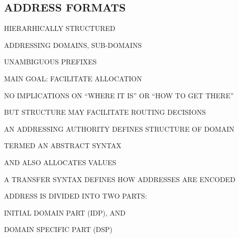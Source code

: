 \begin{bwslide}
\part*	{ADDRESS FORMATS}\bf

\begin{nrtc}
\item	HIERARHICALLY STRUCTURED
    \begin{nrtc}
    \item	ADDRESSING DOMAINS, SUB-DOMAINS

    \item	UNAMBIGUOUS PREFIXES
    \end{nrtc}

\item	MAIN GOAL: FACILITATE ALLOCATION

\item	NO IMPLICATIONS ON ``WHERE IT IS'' OR ``HOW TO GET THERE''
    \begin{nrtc}
    \item	BUT STRUCTURE MAY FACILITATE ROUTING DECISIONS
    \end{nrtc}
\end{nrtc}
\end{bwslide}


\begin{bwslide}

\begin{nrtc}
\item	AN ADDRESSING AUTHORITY DEFINES STRUCTURE OF DOMAIN
    \begin{nrtc}
    \item	TERMED AN ABSTRACT SYNTAX
    \end{nrtc}
    AND ALSO ALLOCATES VALUES

\item	A TRANSFER SYNTAX DEFINES HOW ADDRESSES ARE ENCODED
\end{nrtc}
\end{bwslide}


\begin{bwslide}

\begin{nrtc}
\item	ADDRESS IS DIVIDED INTO TWO PARTS:
    \begin{nrtc}
    \item	INITIAL DOMAIN PART (IDP), AND

    \item	DOMAIN SPECIFIC PART (DSP)
    \end{nrtc}
\end{nrtc}

\end{bwslide}


